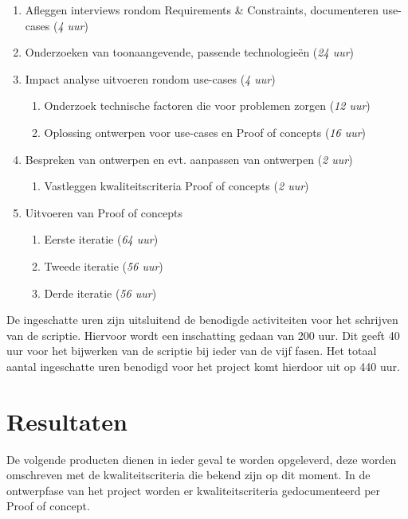 \begin{enumerate}
    \item Afleggen interviews rondom Requirements \& Constraints, documenteren use-cases  (\textit{4 uur})
    \item Onderzoeken van toonaangevende, passende technologieën (\textit{24 uur})
    \item Impact analyse uitvoeren rondom use-cases (\textit{4 uur})
    \begin{enumerate}
        \item Onderzoek technische factoren die voor problemen zorgen (\textit{12 uur})
        \item Oplossing ontwerpen voor use-cases en Proof of concepts (\textit{16 uur})
    \end{enumerate}
    \item Bespreken van ontwerpen en evt. aanpassen van ontwerpen (\textit{2 uur})
    \begin{enumerate}
        \item Vastleggen kwaliteitscriteria Proof of concepts (\textit{2 uur})
    \end{enumerate}
    \item Uitvoeren van Proof of concepts
    \begin{enumerate}
        \item Eerste iteratie (\textit{64 uur})
        \item Tweede iteratie (\textit{56 uur})
        \item Derde iteratie (\textit{56 uur})
    \end{enumerate}
\end{enumerate}

De ingeschatte uren zijn uitsluitend de benodigde activiteiten voor het schrijven van de scriptie. Hiervoor wordt een inschatting gedaan van 200 uur. Dit geeft 40 uur voor het bijwerken van de scriptie bij ieder van de vijf fasen. Het totaal aantal ingeschatte uren benodigd voor het project komt hierdoor uit op 440 uur.

\clearpage

\section{Resultaten}

De volgende producten dienen in ieder geval te worden opgeleverd, deze worden omschreven met de kwaliteitscriteria die bekend zijn op dit moment. In de ontwerpfase van het project worden er kwaliteitscriteria gedocumenteerd per Proof of concept.

